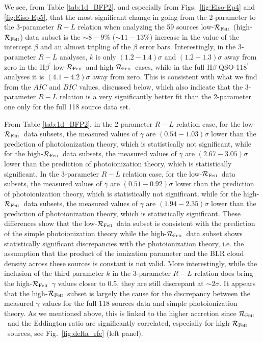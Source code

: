 \documentclass[a4paper,fleqn,usenatbib]{mnras}
\newcommand{\rfe}{${\cal R}_{\rm{Fe\textsc{ii}}}$}
\begin{document}
We see, from Table \ref{tab:1d_BFP2}, and especially from Figs.\ \ref{fig:Eiso-Ep4} and \ref{fig:Eiso-Ep5}, that the most significant change in going from the 2-parameter to the 3-parameter $R-L$ relation when analyzing the 59 sources low-\rfe\ (high-\rfe) data subset is the $\sim 8-9$\% ($\sim 11-13$\%) increase in the value of the intercept $\beta$ and an almost tripling of the $\beta$ error bars. Interestingly, in the 3-parameter $R-L$ analyses, $k$ is only $(1.2-1.4)\sigma$ and $(1.2-1.3)\sigma$ away from zero in the H$\beta^\prime$ low-\rfe\ and high-\rfe\ cases, while in the full H$\beta$ QSO-118$^\prime$ analyses it is $(4.1-4.2)\sigma$ away from zero. This is consistent with what we find from the $AIC$ and $BIC$ values, discussed below, which also indicate that the 3-parameter $R-L$ relation is a very significantly better fit than the 2-parameter one only for the full 118 source data set. 

From Table \ref{tab:1d_BFP2}, in the 2-parameter $R-L$ relation case, for the low-\rfe\ data subsets, the measured values of $\gamma$ are $(0.54-1.03)\sigma$ lower than the prediction of photoionization theory, which is statistically not significant, while for the high-\rfe\ data subsets, the measured values of $\gamma$ are $(2.67-3.05)\sigma$ lower than the prediction of photoionization theory, which is statistically significant. In the 3-parameter $R-L$ relation case, for the low-\rfe\ data subsets, the measured values of $\gamma$ are $(0.51-0.92)\sigma$ lower than the prediction of photoionization theory, which is statistically not significant, while for the high-\rfe\ data subsets, the measured values of $\gamma$ are $(1.94-2.35)\sigma$ lower than the prediction of photoionization theory, which is statistically significant. These differences show that the low-\rfe\ data subset is consistent with the prediction of the simple photoionization theory while the high-\rfe\ data subset shows statistically significant discrepancies with the photoionization theory, i.e. the assumption that the product of the ionization parameter and the BLR cloud density across these sources is constant is not valid. More interestingly, while the inclusion of the third parameter $k$ in the 3-parameter $R-L$ relation does bring the high-\rfe\ $\gamma$ values closer to 0.5, they are still discrepant at $\sim 2\sigma$. It appears that the high-\rfe\ subset is largely the cause for the discrepancy between the measured $\gamma$ values for the full 118 sources data and simple photoionization theory. As we mentioned above, this is linked to the higher accretion since \rfe\ and the Eddington ratio are significantly correlated, especially for high-\rfe\ sources, see Fig.~\ref{fig:delta_rfe} (left panel).  
\end{document}
